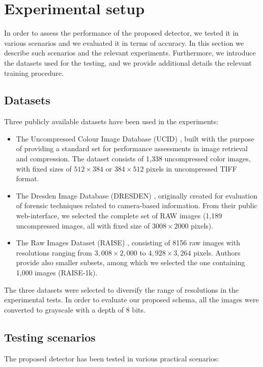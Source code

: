 \documentclass{ieeeaccess}
\begin{document}
\section{Experimental setup}
\label{sec:exp_setup}

In order to assess the performance of the proposed detector, we tested it in various scenarios and we evaluated it in terms of accuracy. In this section we describe such scenarios and the relevant experiments. Furthermore, we introduce the datasets used for the testing, and we provide additional details the relevant training procedure.

\subsection{Datasets}
\label{subsec:datasets}

Three publicly available datasets have been used in the experiments:
\begin{itemize}
	\item The Uncompressed Colour Image Database (UCID) \cite{schaefer2003ucid}, built with the purpose of providing a standard set for performance assessments in image retrieval and compression. The dataset consists of 1,338 uncompressed color images, with fixed sizes of $512\times384$ or $384\times512$ pixels in uncompressed TIFF format.
	\item The Dresden Image Database (DRESDEN) \cite{gloe2010dresden}, originally created for evaluation of forensic techniques related to camera-based information. From their public web-interface, we selected the complete set of RAW images (1,189 uncompressed images, all with fixed size of $3008\times2000$ pixels).
	\item The Raw Images Dataset (RAISE) \cite{dang2015raise}, consisting of 8156 raw images with resolutions ranging from $3,008\times2,000$ to $4,928\times3,264$ pixels. Authors provide also smaller subsets, among which we selected the one containing 1,000 images (RAISE-1k).
\end{itemize}

The three datasets were selected to diversify the range of resolutions in the experimental tests. In order to evaluate our proposed schema, all the images were converted to grayscale with a depth of 8 bits.

\subsection{Testing scenarios}
\label{subsec:test_scenarios}
The proposed detector has been tested in various practical scenarios:
\end{document}

